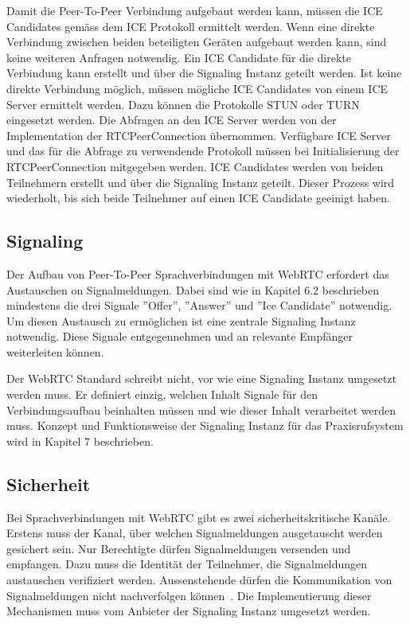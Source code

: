 Damit die Peer-To-Peer Verbindung aufgebaut werden kann, müssen die ICE Candidates gemäss dem ICE Protokoll ermittelt werden.
Wenn eine direkte Verbindung zwischen beiden beteiligten Geräten aufgebaut werden kann, sind keine weiteren Anfragen notwendig.
Ein ICE Candidate für die direkte Verbindung kann erstellt und über die Signaling Instanz geteilt werden.
Ist keine direkte Verbindung möglich, müssen mögliche ICE Candidates von einem ICE Server ermittelt werden.
Dazu können die Protokolle STUN oder TURN eingesetzt werden.
Die Abfragen an den ICE Server werden von der Implementation der RTCPeerConnection übernommen.
Verfügbare ICE Server und das für die Abfrage zu verwendende Protokoll müssen bei Initialisierung der RTCPeerConnection mitgegeben werden.
ICE Candidates werden von beiden Teilnehmern erstellt und über die Signaling Instanz geteilt.
Dieser Prozess wird wiederholt, bis sich beide Teilnehmer auf einen ICE Candidate geeinigt haben.

\subsection{Signaling}

Der Aufbau von Peer-To-Peer Sprachverbindungen mit WebRTC erfordert das Austauschen on Signalmeldungen.
Dabei sind wie in Kapitel 6.2 beschrieben mindestens die drei Signale ''Offer'', ''Answer'' und ''Ice Candidate'' notwendig.
Um diesen Austausch zu ermöglichen ist eine zentrale Signaling Instanz notwendig.
Diese Signale entgegennehmen und an relevante Empfänger weiterleiten können.

Der WebRTC Standard schreibt nicht, vor wie eine Signaling Instanz umgesetzt werden muss.
Er definiert einzig, welchen Inhalt Signale für den Verbindungsaufbau beinhalten müssen und wie dieser Inhalt verarbeitet werden muss.
Konzept und Funktionsweise der Signaling Instanz für das Praxisrufsystem wird in Kapitel 7 beschrieben.

\subsection{Sicherheit}

Bei Sprachverbindungen mit WebRTC gibt es zwei sicherheitskritische Kanäle.
Erstens muss der Kanal, über welchen Signalmeldungen ausgetauscht werden gesichert sein.
Nur Berechtigte dürfen Signalmeldungen versenden und empfangen.
Dazu muss die Identität der Teilnehmer, die Signalmeldungen austauschen verifiziert werden.
Aussenstehende dürfen die Kommunikation von Signalmeldungen nicht nachverfolgen können~\cite{rfc_8827_webRTC_SecurityArchitecture}.
Die Implementierung dieser Mechanismen muss vom Anbieter der Signaling Instanz umgesetzt werden.


